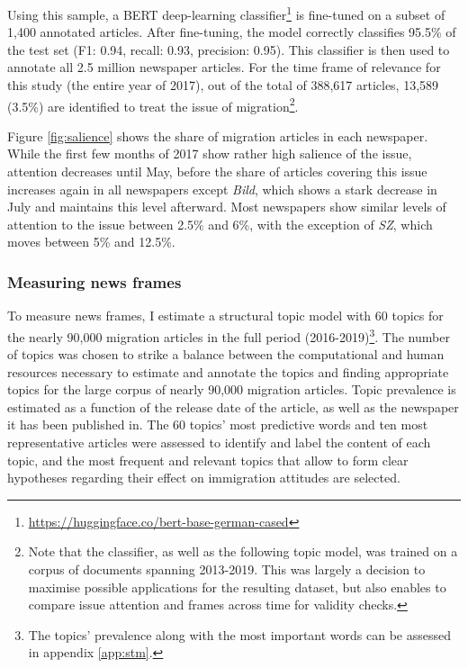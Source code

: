 \documentclass{article}
\begin{document}
Using this sample, a BERT deep-learning classifier\footnote{\url{https://huggingface.co/bert-base-german-cased}} is fine-tuned on a subset of 1,400 annotated articles. After fine-tuning, the model correctly classifies 95.5\% of the test set (F1: 0.94, recall: 0.93, precision: 0.95). This classifier is then used to annotate all 2.5 million newspaper articles. For the time frame of relevance for this study (the entire year of 2017), out of the total of 388,617 articles, 13,589 (3.5\%) are identified to treat the issue of migration\footnote{Note that the classifier, as well as the following topic model, was trained on a corpus of documents spanning 2013-2019. This was largely a decision to maximise possible applications for the resulting dataset, but also enables to compare issue attention and frames across time for validity checks.}.


Figure \ref{fig:salience} shows the share of migration articles in each newspaper. While the first few months of 2017 show rather high salience of the issue, attention decreases until May, before the share of articles covering this issue increases again in all newspapers except \textit{Bild}, which shows a stark decrease in July and maintains this level afterward. Most newspapers show similar levels of attention to the issue between 2.5\% and 6\%, with the exception of \textit{SZ}, which moves between 5\% and 12.5\%.

\subsubsection{Measuring news frames}

To measure news frames, I estimate a structural topic model with 60 topics for the nearly 90,000 migration articles in the full period (2016-2019)\footnote{The topics' prevalence along with the most important words can be assessed in appendix \ref{app:stm}.}. The number of topics was chosen to strike a balance between the computational and human resources necessary to estimate and annotate the topics and finding appropriate topics for the large corpus of nearly 90,000 migration articles. Topic prevalence is estimated as a function of the release date of the article, as well as the newspaper it has been published in. The 60 topics' most predictive words and ten most representative articles were assessed to identify and label the content of each topic, and the most frequent and relevant topics that allow to form clear hypotheses regarding their effect on immigration attitudes are selected. 
\end{document}
